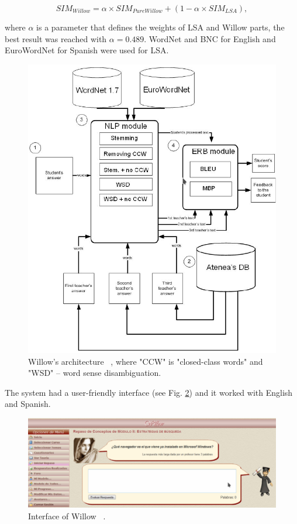 \begin{equation} \label{eq:Willow}
SIM_{Willow} = \alpha \times SIM_{PureWillow} + (1 - \alpha \times SIM_{LSA}),
\end{equation}

where $\alpha$ is a parameter that defines the weights of LSA and Willow parts, the best result was reached with $\alpha = 0.489$. WordNet and BNC for English and EuroWordNet for Spanish were used for LSA.\\

 \begin{figure}[h!]
  \centering
  \includegraphics[width=\textwidth]{img/WillowArch}
    \caption{ Willow's architecture ~\cite{Willow}, where "CCW" is "closed-class words" and "WSD" -- word sense disambiguation.}\label{fig:WillowArch}
\end{figure}

The system had a user-friendly interface (see Fig. \ref{fig:Willow}) and it worked with English and Spanish.\\

\begin{figure}[h!]
  \centering
  \includegraphics[width=\textwidth]{img/Willow}
    \caption{ Interface of Willow ~\cite{Willow}. }\label{fig:Willow}
\end{figure}


